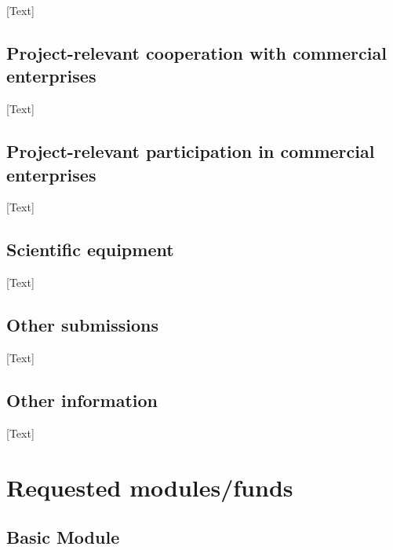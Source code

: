 [Text]

\subsection{Project-relevant cooperation with commercial enterprises}

[Text]

\subsection{Project-relevant participation in commercial enterprises}

[Text]

\subsection{Scientific equipment}

[Text]

\subsection{Other submissions}

[Text]

\subsection{Other information}

[Text]

\section{Requested modules/funds}

\subsection{Basic Module}

